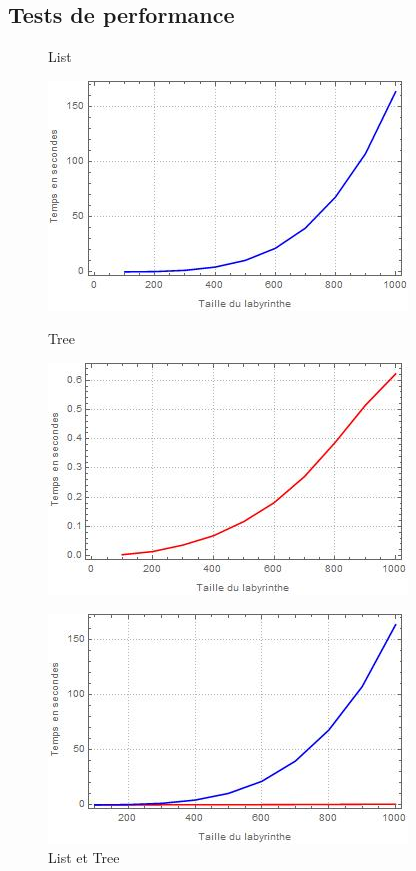 \documentclass[10pt]{article}
\begin{document}
\subsection{Tests de performance}
\begin{figure}[ht]
  \centering
  \begin{minipage}[h]{0.4\textwidth}
  \caption{List}
    \includegraphics[width=\textwidth]{List_graph.jpg}
  \label{list}  
  \end{minipage}
  \hfill
  \begin{minipage}[h]{0.4\textwidth}
  \caption{Tree}
    \includegraphics[width=\textwidth]{Tree_graph.jpg}
  \label{tree}
  \end{minipage}
  \begin{minipage}[h]{0.4\textwidth} 
  \caption{List et Tree}
    \includegraphics[width=\textwidth]{List_Tree_graph.jpg} 

\end{minipage}
\end{figure}
\end{document}
